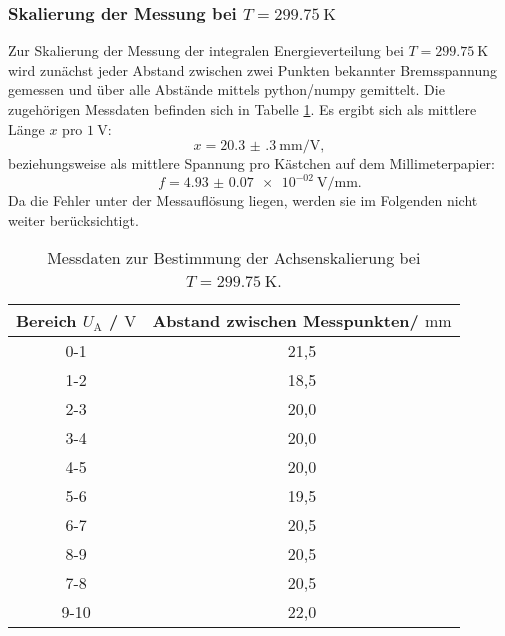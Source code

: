 \subsubsection{Skalierung der Messung bei $T=\SI{299.75}{\kelvin}$}
Zur Skalierung der Messung der integralen Energieverteilung bei $T=\SI{299.75}{\kelvin}$ wird zunächst jeder Abstand zwischen zwei Punkten bekannter Bremsspannung gemessen und über alle Abstände mittels python/numpy \cite{numpy} gemittelt.
Die zugehörigen Messdaten befinden sich in Tabelle \ref{tab:skalaa}.
Es ergibt sich als mittlere Länge $x$ pro $\SI{1}{\volt}$:
\begin{equation}
	x=\SI{20.3(3)}{\milli\meter\per\volt} \mathrm{,}
\end{equation}
beziehungsweise als mittlere Spannung pro Kästchen auf dem Millimeterpapier:
\begin{equation}
	f= \SI{4.93(7)e-02}{\volt\per\milli\meter} \mathrm{.}
\end{equation}
Da die Fehler unter der Messauflösung liegen, werden sie im Folgenden nicht weiter berücksichtigt.
\begin{table}
	\centering
	\caption{Messdaten zur Bestimmung der Achsenskalierung bei $T=\SI{299.75}{\kelvin}$.}
	\label{tab:skalaa}
	\begin{tabular}{cc}
		\toprule
		Bereich $U_{\mathrm{A}}$ / $\si{\volt}$ & Abstand zwischen Messpunkten/ $\si{\milli\meter}$ \\
		\midrule
		0-1 & 21,5 \\
		1-2 & 18,5 \\
		2-3 & 20,0 \\
		3-4 & 20,0 \\
		4-5 & 20,0 \\
		5-6 & 19,5 \\
		6-7 & 20,5 \\
		8-9 & 20,5 \\
		7-8 & 20,5 \\
		9-10 & 22,0 \\
		\bottomrule
	\end{tabular}
\end{table}

\FloatBarrier
